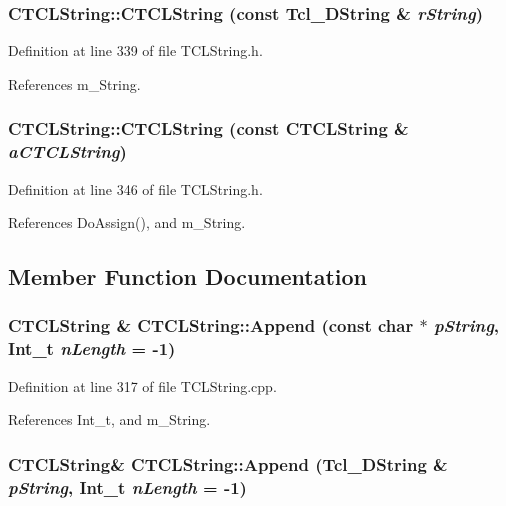 \subsubsection{\setlength{\rightskip}{0pt plus 5cm}CTCLString::CTCLString (const Tcl\_\-DString \& {\em r\-String})\hspace{0.3cm}{\tt  [inline]}}\label{classCTCLString_a4}




Definition at line 339 of file TCLString.h.

References m\_\-String.
\subsubsection{\setlength{\rightskip}{0pt plus 5cm}CTCLString::CTCLString (const CTCLString \& {\em a\-CTCLString})\hspace{0.3cm}{\tt  [inline]}}\label{classCTCLString_a5}




Definition at line 346 of file TCLString.h.

References Do\-Assign(), and m\_\-String.

\subsection{Member Function Documentation}
\subsubsection{\setlength{\rightskip}{0pt plus 5cm}CTCLString \& CTCLString::Append (const char $\ast$ {\em p\-String}, {\bf Int\_\-t} {\em n\-Length} = -1)}\label{classCTCLString_a18}




Definition at line 317 of file TCLString.cpp.

References Int\_\-t, and m\_\-String.
\subsubsection{\setlength{\rightskip}{0pt plus 5cm}CTCLString\& CTCLString::Append (Tcl\_\-DString \& {\em p\-String}, {\bf Int\_\-t} {\em n\-Length} = -1)\hspace{0.3cm}{\tt  [inline]}}\label{classCTCLString_a17}




